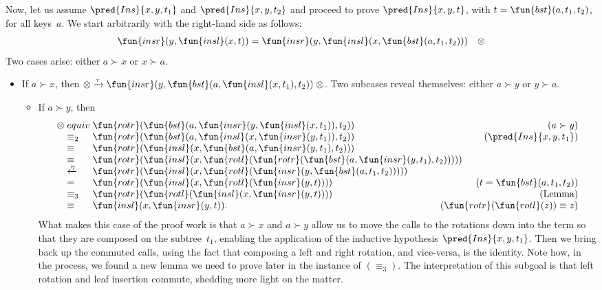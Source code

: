 Now, let us assume \(\pred{Ins}{x,y,t_1}\) and \(\pred{Ins}{x,y,t_2}\)
and proceed to prove \(\pred{Ins}{x,y,t}\), with
\(t=\fun{bst}(a,t_1,t_2)\), for all keys~\(a\). We start arbitrarily
with the right\hyp{}hand side as follows:
\begin{equation*}
\begin{array}{@{}r@{\;}l@{\;}l@{\quad}r@{}}
  \fun{insr}(y,\fun{insl}(x,t))
& = & \fun{insr}(y,\fun{insl}(x,\fun{bst}(a,t_1,t_2))) & \otimes
\end{array}
\end{equation*}
Two cases arise: either \(a \succ x\) or \(x \succ a\).
\begin{itemize}

\item If \(a \succ x\), then \(\otimes \xrightarrow{\smash{\tau}}
  \fun{insr}(y,\fun{bst}(a,\fun{insl}(x,t_1),t_2)) \; \otimes\). Two
  subcases reveal themselves: either \(a \succ y\) or \(y \succ a\).
  \begin{itemize}

    \item If \(a \succ y\), then
      \begin{equation*}
      \begin{array}{@{}r@{\;}l@{\;}l@{\hspace{-8mm}}r@{}}
        \otimes & equiv &
        \fun{rotr}(\fun{bst}(a,\fun{insr}(y,\fun{insl}(x,t_1)),t_2))
        & (a \succ y)\\
        & \equiv_2 & \fun{rotr}(\fun{bst}(a,\fun{insl}(x,
        \fun{insr}(y,t_1)),t_2)) & (\pred{Ins}{x,y,t_1})\\
        & \equiv & \fun{rotr}(\fun{insl}(x,
        \fun{bst}(a,\fun{insr}(y,t_1),t_2)))\\
        & \equiv & \fun{rotr}(\fun{insl}(x,
        \fun{rotl}(\fun{rotr}(\fun{bst}(a,\fun{insr}(y,t_1),t_2)))))\\
        & \xleftarrow{\smash{\eta}} &
        \fun{rotr}(\fun{insl}(x,\fun{rotl}(\fun{insr}(y,
        \fun{bst}(a,t_1,t_2)))))\\
        & = & \fun{rotr}(\fun{insl}(x,\fun{rotl}(\fun{insr}(y,t))))
        & (t=\fun{bst}(a,t_1,t_2))\\
        & \equiv_3 & \fun{rotr}(\fun{rotl}(\fun{insl}(x,
        \fun{insr}(y,t)))) & (\text{Lemma})\\
        & \equiv & \fun{insl}(x,\fun{insr}(y,t)).
        & (\fun{rotr}(\fun{rotl}(z)) \equiv z)
      \end{array}
      \end{equation*}
      What makes this case of the proof work is that \(a \succ x\) and
      \(a \succ y\) allow us to move the calls to the rotations down
      into the term so that they are composed on the subtree~\(t_1\),
      enabling the application of the inductive hypothesis
      \(\pred{Ins}{x,y,t_1}\). Then we bring back up the commuted
      calls, using the fact that composing a left and right rotation,
      and vice\hyp{}versa, is the identity. Note how, in the process,
      we found a new lemma we need to prove later in the instance of
      \((\equiv_3)\). The interpretation of this subgoal is that left
      rotation and leaf insertion commute, shedding more light on the
      matter.


\end{itemize}
\end{itemize}
